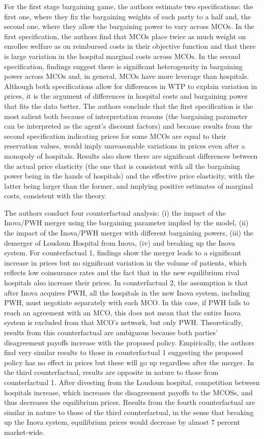 \documentclass[12pt,english]{article}
\begin{document}
For the first stage bargaining game, the authors estimate two specifications: the first one, where they fix the bargaining weights of each party to a half and, the second one, where they allow the bargaining power to vary across MCOs. In the first specification, the authors find that MCOs place twice as much weight on enrollee welfare as on reimbursed costs in their objective function and that there is large variation in the hospital marginal costs across MCOs. In the second specification, findings suggest there is significant heterogeneity in bargaining power across MCOs and, in general, MCOs have more leverage than hospitals. Although both specifications allow for differences in WTP to explain variation in prices, it is the argument of differences in hospital costs and bargaining power that fits the data better. The authors conclude that the first specification is the most salient both because of interpretation reasons (the bargaining parameter can be interpreted as the agent's discount factors) and because results from the second specification indicating prices for some MCOs are equal to their reservation values, would imply unreasonable variations in prices even after a monopoly of hospitals. Results also show there are significant differences between the actual price elasticity (the one that is consistent with all the bargaining power being in the hands of hospitals) and the effective price elasticity, with the latter being larger than the former, and implying positive estimates of marginal costs, consistent with the theory.

The authors conduct four counterfactual analysis: (i) the impact of the Inova/PWH merger using the bargaining parameter implied by the model, (ii) the impact of the Inova/PWH merger with different bargaining powers, (iii) the demerger of Loudoun Hospital from Inova, (iv) and breaking up the Inova system. For counterfactual 1, findings show the merger leads to a significant increase in prices but no significant variation in the volume of patients, which reflects low coinsurance rates and the fact that in the new equilibrium rival hospitals also increase their prices. In counterfactual 2, the assumption is that after Inova acquires PWH, all the hospitals in the new Inova system, including PWH, must negotiate separately with each MCO. In this case, if PWH fails to reach an agreement with an MCO, this does not mean that the entire Inova system is excluded from that MCO's network, but only  PWH. Theoretically, results from this counterfactual are ambiguous because both parties' disagreement payoffs increase with the proposed policy. Empirically, the authors find very similar results to those in counterfactual 1 suggesting the proposed policy has no effect in prices but these will go up regardless after the merger. In the third counterfactual, results are opposite in nature to those from counterfactual 1. After divesting from the Loudoun hospital, competition between hospitals increase, which increases the disagreement payoffs to the MCOSs, and thus decreases the equilibrium prices. Results from the fourth counterfactual are similar in nature to those of the third counterfactual, in the sense that breaking up the Inova system, equilibrium prices would decrease by almost 7 percent market-wide.
\end{document}
